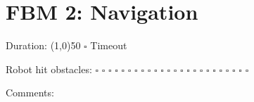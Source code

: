 \section*{FBM 2: Navigation}


\vspace{0.4cm}

\noindent Duration: \line(1,0){50} \hspace{0.5cm} $\square$ Timeout

\vspace{0.7cm}

\noindent Robot hit obstacles: $\square$ $\square$ $\square$ $\square$ $\square$ $\square$ $\square$ $\square$ $\square$ $\square$ $\square$ $\square$ $\square$ $\square$ $\square$ $\square$ $\square$ $\square$ $\square$ $\square$ $\square$ $\square$ $\square$ $\square$

\vspace{0.4cm}
\noindent Comments: \hrulefill 

\noindent \hrulefill

\vspace{1.0cm}


